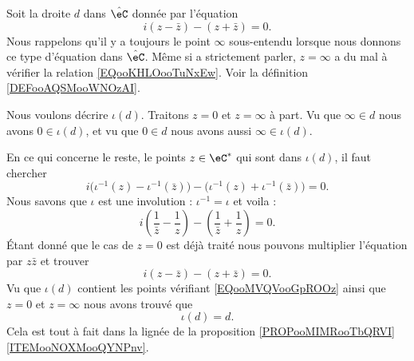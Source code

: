 \begin{example}[Inversion d'une droite passant par $z=0$]
    Soit la droite \( d\) dans \( \hat \eC\) donnée par l'équation
    \begin{equation}        \label{EQooKHLOooTuNxEw}
        i(z-\bar z)-(z+\bar z)=0.
    \end{equation}
    Nous rappelons qu'il y a toujours le point \( \infty\) sous-entendu lorsque nous donnons ce type d'équation dans \( \hat\eC\). Même si a strictement parler, \( z=\infty\) a du mal à vérifier la relation \eqref{EQooKHLOooTuNxEw}. Voir la définition \ref{DEFooAQSMooWNOzAI}.

    Nous voulons décrire \( \iota(d)\). Traitons \( z=0\) et \( z=\infty\) à part. Vu que \( \infty\in d\) nous avons \( 0\in\iota(d)\), et vu que \( 0\in d\) nous avons aussi \( \infty\in \iota(d)\).

    En ce qui concerne le reste, le points \( z\in \eC^*\) qui sont dans \( \iota(d)\), il faut chercher
    \begin{equation}
        i\big( \iota^{-1}(z)-\iota^{-1}(\bar z) \big)-\big( \iota^{-1}(z)+\iota^{-1}(\bar z) \big)=0.
    \end{equation}
    Nous savons que \( \iota\) est une involution : \( \iota^{-1}=\iota\) et voila :
    \begin{equation}
        i\left( \frac{1}{ \bar z }-\frac{1}{ z } \right)-\left( \frac{1}{ \bar z }+\frac{1}{ z} \right)=0.
    \end{equation}
    Étant donné que le cas de \( z=0\) est déjà traité nous pouvons multiplier l'équation par \( z\bar z\) et trouver
    \begin{equation}        \label{EQooMVQVooGpROOz}
        i(z-\bar z)-(z+\bar z)=0.
    \end{equation}
    Vu que \( \iota(d)\) contient les points vérifiant \eqref{EQooMVQVooGpROOz} ainsi que \( z=0\) et \( z=\infty\) nous avons trouvé que
    \begin{equation}
        \iota(d)=d.
    \end{equation}
    Cela est tout à fait dans la lignée de la proposition \ref{PROPooMIMRooTbQRVI}\ref{ITEMooNOXMooQYNPnv}.
\end{example}

